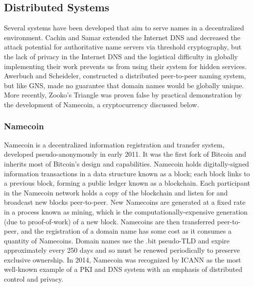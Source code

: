 \documentclass{sig-alternate}
\begin{document}
\subsection{Distributed Systems}

Several systems have been developed that aim to serve names in a decentralized environment. Cachin and Samar\cite{cachin2004secure} extended the Internet DNS and decreased the attack potential for authoritative name servers via threshold cryptography, but the lack of privacy in the Internet DNS and the logistical difficulty in globally implementing their work prevents us from using their system for hidden services. Awerbuch and Scheideler,\cite{awerbuch2004group} constructed a distributed peer-to-peer naming system, but like GNS, made no guarantee that domain names would be globally unique. More recently, Zooko's Triangle was proven false by practical demonstration by the development of Namecoin, a cryptocurrency discussed below.

\subsubsection{Namecoin}

Namecoin is a decentralized information registration and transfer system, developed pseudo-anonymously in early 2011. It was the first fork of Bitcoin\cite{nakamoto2008bitcoin} and inherits most of Bitcoin's design and capabilities. Namecoin holds digitally-signed information transactions in a data structure known as a block; each block links to a previous block, forming a public ledger known as a blockchain. Each participant in the Namecoin network holds a copy of the blockchain and listen for and broadcast new blocks peer-to-peer. New Namecoins are generated at a fixed rate in a process known as mining, which is the computationally-expensive generation (due to proof-of-work) of a new block. Namecoins are then transferred peer-to-peer, and the registration of a domain name has some cost as it consumes a quantity of Namecoins. Domain names use the .bit pseudo-TLD and expire approximately every 250 days and so must be renewed periodically to preserve exclusive ownership. In 2014, Namecoin was recognized by ICANN as the most well-known example of a PKI and DNS system with an emphasis of distributed control and privacy.\cite{NamecoinReportICANN}
\end{document}
